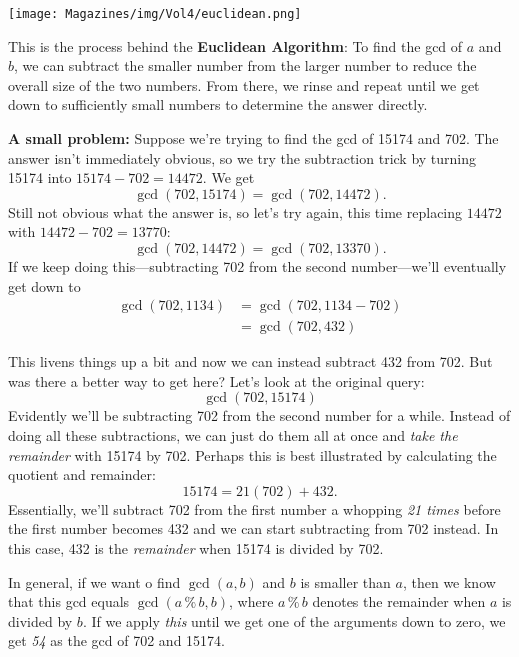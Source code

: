 \documentclass{article}
\begin{document}
\begin{multicols}{3}
\begin{center}
\texttt{[image: Magazines/img/Vol4/euclidean.png]}
\end{center}

This is the process behind the \textbf{Euclidean Algorithm}: To find the gcd of $a$ and $b$, we can subtract the smaller number from the larger number to reduce the overall size of the two numbers. From there, we rinse and repeat until we get down to sufficiently small numbers to determine the answer directly.

\textbf{A small problem:} Suppose we're trying to find the gcd of 15174 and 702. The answer isn't immediately obvious, so we try the subtraction trick by turning 15174 into $15174 - 702 = 14472$. We get
$$\gcd(702, 15174) = \gcd(702, 14472).$$
Still not obvious what the answer is, so let's try again, this time replacing $14472$ with $14472 - 702 = 13770$:
$$\gcd(702, 14472) = \gcd(702, 13370).$$
If we keep doing this---subtracting 702 from the second number---we'll eventually get down to
\begin{align*}
\gcd(702, 1134) & = \gcd(702, 1134 - 702) \\
    & = \gcd(702, 432)
\end{align*}

This livens things up a bit and now we can instead subtract 432 from 702. But was there a better way to get here? Let's look at the original query:
$$\gcd(702, 15174)$$
Evidently we'll be subtracting 702 from the second number for a while. Instead of doing all these subtractions, we can just do them all at once and \textit{take the remainder} with 15174 by 702. Perhaps this is best illustrated by calculating the quotient and remainder:
$$15174 = 21(702) + 432.$$
Essentially, we'll subtract 702 from the first number a whopping \textit{21 times} before the first number becomes 432 and we can start subtracting from 702 instead. In this case, 432 is the \textit{remainder} when 15174 is divided by 702.

In general, if we want o find $\gcd(a, b)$ and $b$ is smaller than $a$, then we know that this gcd equals $\gcd(a\,\%\,b, b)$, where $a\,\%\,b$ denotes the remainder when $a$ is divided by $b$. If we apply \textit{this} until we get one of the arguments down to zero, we get \textit{54} as the gcd of 702 and 15174.


\end{multicols}
\end{document}
